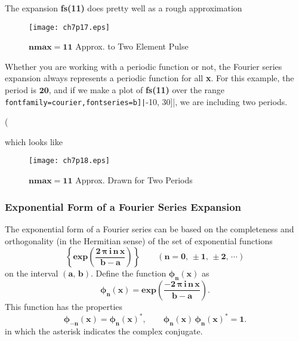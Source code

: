 \documentclass[12pt]{article}
\newcommand{\mv}{\Verb[fontfamily=courier,fontseries=b]}
\begin{document}
\newpage
\noindent The expansion \textbf{fs(11)} does pretty well as a rough approximation
\begin{figure} [h!]
   \centerline{\texttt{[image: ch7p17.eps]} }
	\caption{$\mathbf{nmax = 11}$ Approx. to Two Element Pulse }
\end{figure}   

\noindent Whether you are working with a periodic function or not, the Fourier
  series expansion always represents a periodic function for all \textbf{x}.
For this example, the period is $$, and if we make a plot of \textbf{fs(11)}
  over the range \mv|[-10, 30]|, we are including two periods.
\begin{myVerbatim}
(%
\end{myVerbatim}
which looks like
\smallskip
\begin{figure} [h]
   \centerline{\texttt{[image: ch7p18.eps]} }
	\caption{$\mathbf{nmax = 11}$ Approx. Drawn for Two Periods }
\end{figure}   

\newpage
\subsubsection{Exponential Form of a Fourier Series Expansion} \label{expfs}
The exponential form of a Fourier series can be based on the completeness and
  orthogonality (in the Hermitian sense) of the set of exponential functions
\begin{equation}
\left\{ \mathbf{ exp\left(\frac{2\,\boldsymbol{\pi}\,i\,n\,x}{b-a} \right) } \right\} \qquad 
\mathbf{(n=0,\, \pm 1,\, \pm 2,\, \cdots) }
\end{equation}
on the interval $$.
Define the function $$ as
\begin{equation} \label{Eq:phi1}
\mathbf{\boldsymbol{\phi}_{n}(x) =  exp \left(\frac{- 2\,\boldsymbol{\pi}\,i\,n\,x}{b-a} \right) }.
\end{equation}
This function has the properties
\begin{equation} \label{Eq:phi2}
\mathbf{\boldsymbol{ \phi}_{-n}(x) = \boldsymbol{\phi}_{n}(x)^{\ast} ,\qquad 
\boldsymbol{\phi}_{n}(x) \, \boldsymbol{\phi}_{n}(x)^{\ast}  = 1}.
\end{equation}
in which the asterisk indicates the complex conjugate.\\
\end{document}
